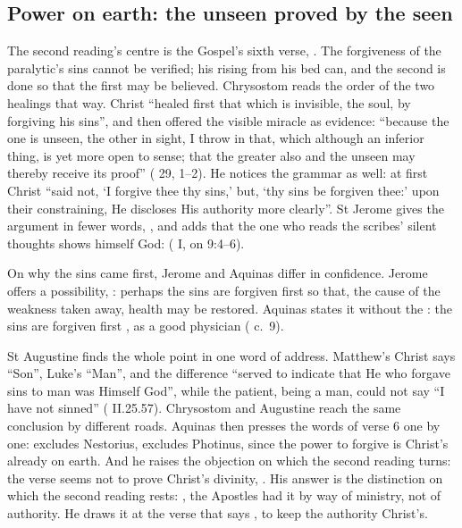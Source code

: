 \subsection{Power on earth: the unseen proved by the seen}

The second reading's centre is the Gospel's sixth verse, . The
forgiveness of the paralytic's sins cannot be verified; his rising from his bed
can, and the second is done so that the first may be believed. Chrysostom reads
the order of the two healings that way. Christ ``healed first that which is
invisible, the soul, by forgiving his sins'', and then offered the visible
miracle as evidence: ``because the one is unseen, the other in sight, I throw in
that, which although an inferior thing, is yet more open to sense; that the
greater also and the unseen may thereby receive its proof'' ( 29, 1--2). He notices the grammar as well: at first Christ ``said not,
`I forgive thee thy sins,' but, `thy sins be forgiven thee:' upon their
constraining, He discloses His authority more clearly''. St Jerome gives the
argument in fewer words, , and adds that the one who reads the scribes' silent thoughts shows
himself God:  ( I, on 9:4--6).

On why the sins came first, Jerome and Aquinas differ in confidence. Jerome
offers a possibility, : perhaps the sins are forgiven
first so that, the cause of the weakness taken away, health may be restored.
Aquinas states it without the : the sins are forgiven first
, as a good physician  ( c.~9).

St Augustine finds the whole point in one word of address. Matthew's Christ
says ``Son'', Luke's ``Man'', and the difference ``served to indicate that He who
forgave sins to man was Himself God'', while the patient, being a man, could
not say ``I have not sinned'' ( II.25.57).
Chrysostom and Augustine reach the same conclusion by different roads. Aquinas
then presses the words of verse 6 one by one:  excludes
Nestorius,  excludes Photinus, since the power to forgive is
Christ's already on earth. And he raises the objection on which the second
reading turns: the verse seems not to prove Christ's divinity, . His answer is the distinction on which the
second reading rests: , the Apostles had it by way of ministry, not of authority. He
draws it at the verse that says , to keep the authority
Christ's.

